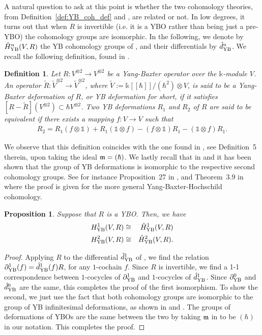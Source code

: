 \documentclass[11pt,fleqn]{amsart} %
\newtheorem{proposition}[theorem]{Proposition}
\newtheorem{definition}[theorem]{Definition}
\begin{document}
A natural question to ask at this point is whether the two cohomology theories, from Definition~\ref{def:YB_coh_def} and \cite{Eis}, are related or not. In low degrees, it turns out that when $R$ is invertible (i.e. it is a YBO rather than being just a pre-YBO) the cohomology groups are isomorphic. In the following, we denote by 
$\hat H^n_{\rm YB}(V,R)$ the YB cohomology groups of  \cite{Eis1,Eis}, and  their differentials by $\hat d_{\rm YB}^n$. 
	We recall the following definition, found in \cite{SZ-YBH}. 
		\begin{definition}
			{\rm 
				Let $R : V^{\otimes 2} \longrightarrow V^{\otimes 2}$ be a Yang-Baxter operator over the  $\mathbb k$-module $V$. 
				An operator  $\tilde R: \tilde V^{\otimes 2} \longrightarrow \tilde V^{\otimes 2}$, where  $\tilde V := \mathbb k[[\hbar]]/(\hbar^2)\otimes V$,
				is said to be a {\it Yang-Baxter deformation} of 
				$R$,
				or YB deformation for short, if it satisfies $[R - \tilde R] (V^{\otimes 2}) \subset \hbar V^{\otimes 2}$. 
				Two YB deformations $R_1$ and $R_2$ of $R$ are said to be equivalent if there exists a mapping $f: V \longrightarrow V$ such that 
				\begin{eqnarray*}
						R_2 = R_1 ( f \otimes {\mathbb 1}) + R_1 ( {\mathbb 1} \otimes  f ) 
						-  ( f \otimes {\mathbb 1}) R_1 - ( {\mathbb 1} \otimes  f )  R_1. 
				\end{eqnarray*}
			}
		\end{definition}
		We observe that this definition coincides with the one found in \cite{Eis1}, see Definition~5 therein, upon taking the ideal $\frak m = (\hbar)$. We lastly recall that in \cite{Eis,Eis1} and \cite{SZ-YBH} it has been shown that the group of YB deformations is isomorphic to the respective second cohomology groups.  See for instance Proposition~27 in \cite{Eis1}, and Theorem~3.9 in \cite{SZ-YBH} where the proof is given for the more general Yang-Baxter-Hochschild cohomology.


\begin{proposition}
		Suppose that $R$ is a YBO. Then, we have
		\begin{eqnarray*}
				H^1_{\rm YB}(V,R) &\cong& \hat H^1_{\rm YB}(V,R)\\
				H^2_{\rm YB}(V,R) &\cong& \hat H^2_{\rm YB}(V,R).
		\end{eqnarray*}
\end{proposition}
\begin{proof}
			Applying $R$ to the differential $\hat d^1_{\rm YB}$ of \cite{Eis}, we find the relation $\partial^1_{\rm YB}(f) = \hat d^1_{\rm YB}(f)R$, for any $1$-cochain $f$. Since $R$ is invertible, we find a 1-1 correspondence between $1$-cocycles of $\partial^1_{\rm YB}$ and $1$-cocycles of $\hat d^1_{\rm YB}$. Since $\partial^0_{\rm YB}$ and $\hat d^0_{\rm YB}$ are the same, this completes the proof of the first isomorphism. 
			To show the second, we just use the fact that both cohomology groups are isomorphic to the group of YB infinitesimal deformations, as shown in \cite{Eis1} and \cite{SZ-YBH}. 
			The groups of deformations of YBOs are the same between the two by taking $\frak m$ in \cite{Eis1} to be $(\hbar)$ in our notation.
			This completes the proof.
\end{proof}
\end{document}
